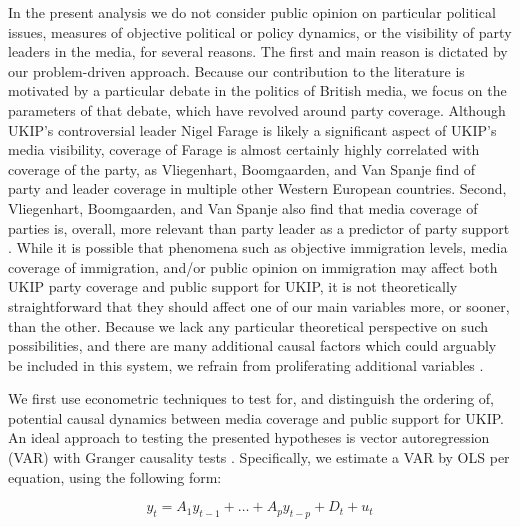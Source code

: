 \documentclass[12pt,]{article}
\begin{document}
In the present analysis we do not consider public opinion on particular
political issues, measures of objective political or policy dynamics, or
the visibility of party leaders in the media, for several reasons. The
first and main reason is dictated by our problem-driven approach.
Because our contribution to the literature is motivated by a particular
debate in the politics of British media, we focus on the parameters of
that debate, which have revolved around party coverage. Although UKIP's
controversial leader Nigel Farage is likely a significant aspect of
UKIP's media visibility, coverage of Farage is almost certainly highly
correlated with coverage of the party, as Vliegenhart, Boomgaarden, and
Van Spanje find of party and leader coverage in multiple other Western
European countries. Second, Vliegenhart, Boomgaarden, and Van Spanje
also find that media coverage of parties is, overall, more relevant than
party leader as a predictor of party support
\citep[333]{vliegenthart_anti-immigrant_2012}. While it is possible that
phenomena such as objective immigration levels, media coverage of
immigration, and/or public opinion on immigration may affect both UKIP
party coverage and public support for UKIP, it is not theoretically
straightforward that they should affect one of our main variables more,
or sooner, than the other. Because we lack any particular theoretical
perspective on such possibilities, and there are many additional causal
factors which could arguably be included in this system, we refrain from
proliferating additional variables \citep{Achen:2006fp}.

We first use econometric techniques to test for, and distinguish the
ordering of, potential causal dynamics between media coverage and public
support for UKIP. An ideal approach to testing the presented hypotheses
is vector autoregression (VAR) with Granger causality tests
\citep{brandt2007multiple, vliegenthart_anti-immigrant_2012}.
Specifically, we estimate a VAR by OLS per equation, using the following
form:

\begin{equation}
 \label{eq:VAR}
   y_t = A_1 y_{t-1} + \dots + A_p y_{t-p} + D_t + u_t
\end{equation}
\end{document}
